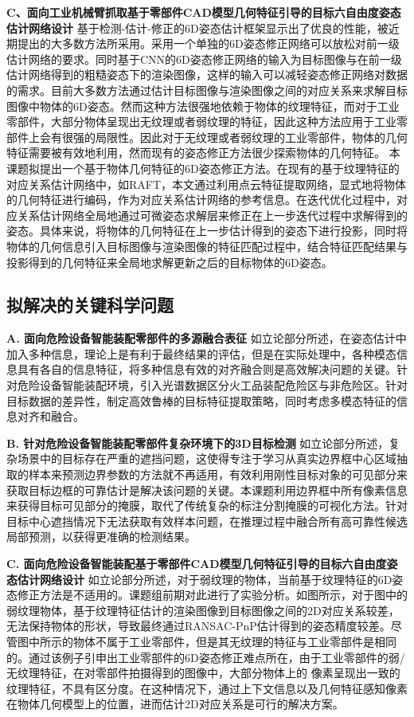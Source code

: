 \documentclass[12pt]{article}
\begin{document}
\textbf{C、面向工业机械臂抓取基于零部件CAD模型几何特征引导的目标六自由度姿态估计网络设计}
基于检测-估计-修正的6D姿态估计框架显示出了优良的性能，被近期提出的大多数方法所采用。采用一个单独的6D姿态修正网络可以放松对前一级估计网络的要求。同时基于CNN的6D姿态修正网络的输入为目标图像与在前一级估计网络得到的粗糙姿态下的渲染图像，这样的输入可以减轻姿态修正网络对数据的需求。目前大多数方法通过估计目标图像与渲染图像之间的对应关系来求解目标图像中物体的6D姿态。然而这种方法很强地依赖于物体的纹理特征，而对于工业零部件，大部分物体呈现出无纹理或者弱纹理的特征，因此这种方法应用于工业零部件上会有很强的局限性。因此对于无纹理或者弱纹理的工业零部件，物体的几何特征需要被有效地利用，然而现有的姿态修正方法很少探索物体的几何特征。
本课题拟提出一个基于物体几何特征的6D姿态修正方法。在现有的基于纹理特征的对应关系估计网络中，如RAFT，本文通过利用点云特征提取网络，显式地将物体的几何特征进行编码，作为对应关系估计网络的参考信息。在迭代优化过程中，对应关系估计网络全局地通过可微姿态求解层来修正在上一步迭代过程中求解得到的姿态。具体来说，将物体的几何特征在上一步估计得到的姿态下进行投影，同时将物体的几何信息引入目标图像与渲染图像的特征匹配过程中，结合特征匹配结果与投影得到的几何特征来全局地求解更新之后的目标物体的6D姿态。



\subsection{拟解决的关键科学问题}

\textbf{A. 面向危险设备智能装配零部件的多源融合表征}
如立论部分所述，在姿态估计中加入多种信息，理论上是有利于最终结果的评估，但是在实际处理中，各种模态信息具有各自的信息特征，将多种信息有效的对齐融合则是高效解决问题的关键。针对危险设备智能装配环境，引入光谱数据区分火工品装配危险区与非危险区。针对目标数据的差异性，制定高效鲁棒的目标特征提取策略，同时考虑多模态特征的信息对齐和融合。

\textbf{B. 针对危险设备智能装配零部件复杂环境下的3D目标检测}
如立论部分所述，复杂场景中的目标存在严重的遮挡问题，这使得专注于学习从真实边界框中心区域抽取的样本来预测边界参数的方法就不再适用，有效利用刚性目标对象的可见部分来获取目标边框的可靠估计是解决该问题的关键。本课题利用边界框中所有像素信息来获得目标可见部分的掩膜，取代了传统复杂的标注分割掩膜的可视化方法。针对目标中心遮挡情况下无法获取有效样本问题，在推理过程中融合所有高可靠性候选局部预测，以获得更准确的检测结果。

\textbf{C. 面向危险设备智能装配基于零部件CAD模型几何特征引导的目标六自由度姿态估计网络设计}
如立论部分所述，对于弱纹理的物体，当前基于纹理特征的6D姿态修正方法是不适用的。课题组前期对此进行了实验分析。如图所示，对于图中的弱纹理物体，基于纹理特征估计的渲染图像到目标图像之间的2D对应关系较差，无法保持物体的形状，导致最终通过RANSAC-PnP估计得到的姿态精度较差。尽管图中所示的物体不属于工业零部件，但是其无纹理的特征与工业零部件是相同的。通过该例子引申出工业零部件的6D姿态修正难点所在，由于工业零部件的弱/无纹理特征，在对零部件拍摄得到的图像中，大部分物体上的 像素呈现出一致的纹理特征，不具有区分度。在这种情况下，通过上下文信息以及几何特征感知像素在物体几何模型上的位置，进而估计2D对应关系是可行的解决方案。
\end{document}
